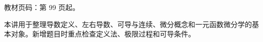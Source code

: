 
\begin{knowledgeBox}
教材页码：第 99 页起。

本讲用于整理导数定义、左右导数、可导与连续、微分概念和一元函数微分学的基本对象。新增题目时重点检查定义法、极限过程和可导条件。
\end{knowledgeBox}
